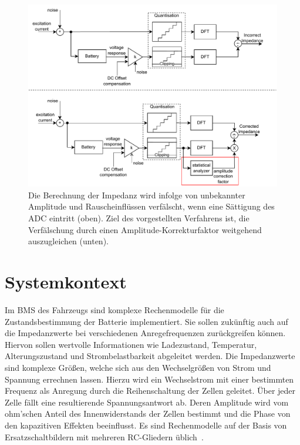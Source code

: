 \begin{figure}[tbh!] 
	\centering 
	\includegraphics[width=1\textwidth]{../img/system.pdf}
	\caption{Die Berechnung der Impedanz wird infolge von unbekannter Amplitude und Rauscheinflüssen verfälscht, wenn eine Sättigung des ADC eintritt (oben). Ziel des vorgestellten Verfahrens ist, die Verfälschung durch einen Amplitude-Korrekturfaktor weitgehend auszugleichen (unten).}
	\label{fig:system}
\end{figure}

\section{Systemkontext}
Im BMS des Fahrzeugs sind komplexe Rechenmodelle für die Zustandsbestimmung der Batterie implementiert. Sie sollen zukünftig auch auf die Impedanzwerte bei verschiedenen Anregefrequenzen zurückgreifen können. Hiervon sollen wertvolle Informationen wie Ladezustand, Temperatur, Alterungszustand und Strombelastbarkeit abgeleitet werden. Die Impedanzwerte sind komplexe Größen, welche sich aus den Wechselgrößen von Strom und Spannung errechnen lassen. Hierzu wird ein Wechselstrom mit einer bestimmten Frequenz als Anregung durch die Reihenschaltung der Zellen geleitet. Über jeder Zelle fällt eine resultierende Spannungsantwort ab. Deren Amplitude wird vom ohm'schen Anteil des Innenwiderstands der Zellen bestimmt und die Phase von den kapazitiven Effekten beeinflusst. Es sind Rechenmodelle auf der Basis von Ersatzschaltbildern mit mehreren RC-Gliedern üblich~\cite{KeilJossen-2012}.

